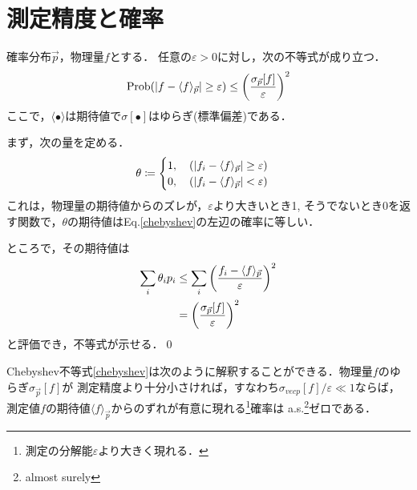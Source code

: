 %
\section{測定精度と確率}
  \begin{thm}[Chebyshev不等式]
    確率分布$\vec{p}$，物理量$f$とする．
    任意の$\varepsilon>0$に対し，次の不等式が成り立つ．
    \begin{align}
      \mathrm{Prob} \qty(\abs{f-\langle f \rangle_{\vec{p}}} \geq \varepsilon) \leq \qty(\frac{\sigma_{\vec{p}}[f]}{\varepsilon})^2\label{chebyshev}
    \end{align}
    ここで，$\langle\bullet\rangle$は期待値で$\sigma[\bullet]$はゆらぎ(標準偏差)である．
  \end{thm}
  \begin{pr}
    まず，次の量を定める．
    \begin{align}
      \theta \coloneqq 
        \begin{cases}
          1,\quad (\abs{f_i-\langle f \rangle _{\vec{p}}}\geq \varepsilon)\\
          0,\quad (\abs{f_i-\langle f \rangle _{\vec{p}}} < \varepsilon)
        \end{cases}
    \end{align}
    これは，物理量の期待値からのズレが，$\varepsilon$より大きいとき1,
    そうでないとき0を返す関数で，$\theta$の期待値はEq.\eqref{chebyshev}の左辺の確率に等しい．

    ところで，その期待値は
    \begin{align}
      \sum_{i} \theta_ip_i &\leq \sum_{i}\qty(\frac{f_i-\langle f \rangle_{\vec{p}}}{\varepsilon})^2\\
      &=\qty(\frac{\sigma_{\vec{p}}[f]}{\varepsilon})^2
    \end{align}
    と評価でき，不等式が示せる．\qed
  \end{pr}

  Chebyshev不等式\eqref{chebyshev}は次のように解釈することができる．物理量$f$のゆらぎ$\sigma_{\vec{p}}[f]$が
  測定精度より十分小さければ，すなわち$\sigma_{vec{p}}[f]/\varepsilon \ll 1$ならば，
  測定値$f$の期待値$\langle f \rangle_{\vec{p}}$からのずれが有意に現れる\footnote{測定の分解能$\varepsilon$より大きく現れる．}確率は
  a.s.\footnote{almost surely}ゼロである．
